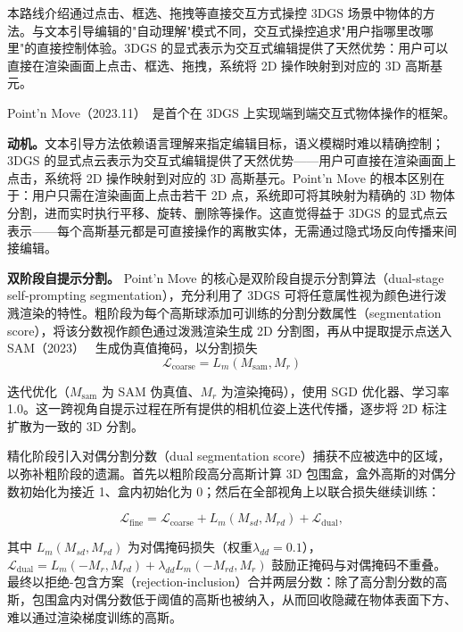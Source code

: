 本路线介绍通过点击、框选、拖拽等直接交互方式操控 3DGS 场景中物体的方法。与文本引导编辑的"自动理解"模式不同，交互式操控追求"用户指哪里改哪里"的直接控制体验。3DGS 的显式表示为交互式编辑提供了天然优势：用户可以直接在渲染画面上点击、框选、拖拽，系统将 2D 操作映射到对应的 3D 高斯基元。

Point'n Move（2023.11）~\cite{2311_16737}是首个在 3DGS 上实现端到端交互式物体操作的框架。

\textbf{动机。}文本引导方法依赖语言理解来指定编辑目标，语义模糊时难以精确控制；3DGS 的显式点云表示为交互式编辑提供了天然优势——用户可直接在渲染画面上点击，系统将 2D 操作映射到对应的 3D 高斯基元。Point'n Move 的根本区别在于：用户只需在渲染画面上点击若干 2D 点，系统即可将其映射为精确的 3D 物体分割，进而实时执行平移、旋转、删除等操作。这直觉得益于 3DGS 的显式点云表示——每个高斯基元都是可直接操作的离散实体，无需通过隐式场反向传播来间接编辑。

\textbf{双阶段自提示分割。} Point'n Move 的核心是双阶段自提示分割算法（dual-stage self-prompting segmentation），充分利用了 3DGS 可将任意属性视为颜色进行泼溅渲染的特性。粗阶段为每个高斯球添加可训练的分割分数属性（segmentation score），将该分数视作颜色通过泼溅渲染生成 2D 分割图，再从中提取提示点送入 SAM（2023）~\cite{sam} 生成伪真值掩码，以分割损失
\begin{equation}
\mathcal{L}_{\text{coarse}} = L_m(M_{\text{sam}}, M_r)
\end{equation}

迭代优化（$M_{\text{sam}}$ 为 SAM 伪真值、$M_r$ 为渲染掩码），使用 SGD 优化器、学习率 1.0。这一跨视角自提示过程在所有提供的相机位姿上迭代传播，逐步将 2D 标注扩散为一致的 3D 分割。

精化阶段引入对偶分割分数（dual segmentation score）捕获不应被选中的区域，以弥补粗阶段的遗漏。首先以粗阶段高分高斯计算 3D 包围盒，盒外高斯的对偶分数初始化为接近 1、盒内初始化为 0；然后在全部视角上以联合损失继续训练：

\begin{equation}
\mathcal{L}_{\text{fine}} = \mathcal{L}_{\text{coarse}} + L_m(M_{sd}, M_{rd}) + \mathcal{L}_{\text{dual}},
\end{equation}

其中 $L_m(M_{sd}, M_{rd})$ 为对偶掩码损失（权重$\lambda_{dd}=0.1$），$\mathcal{L}_{\text{dual}} = L_m(-M_r, M_{rd}) + \lambda_{dd} L_m(-M_{rd}, M_r)$ 鼓励正掩码与对偶掩码不重叠。最终以拒绝-包含方案（rejection-inclusion）合并两层分数：除了高分割分数的高斯，包围盒内对偶分数低于阈值的高斯也被纳入，从而回收隐藏在物体表面下方、难以通过渲染梯度训练的高斯。

